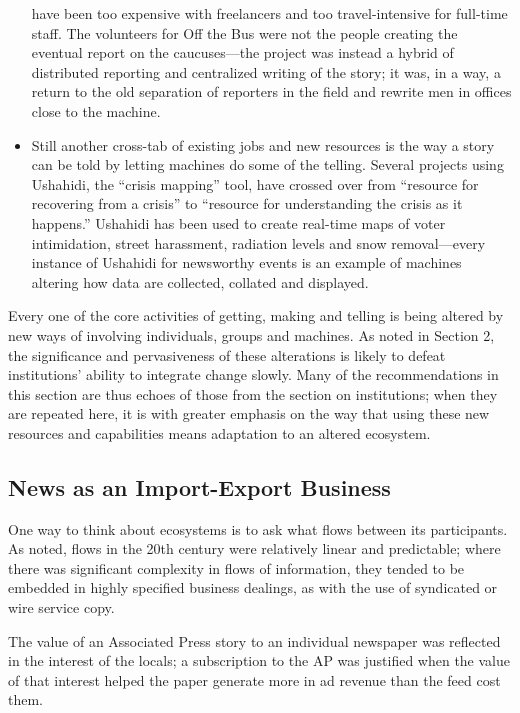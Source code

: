 \begin{itemize}
have been too expensive with freelancers and too travel-intensive for
full-time staff. The volunteers for Off the Bus were not the people
creating the eventual report on the caucuses—the project was instead
a hybrid of distributed reporting and centralized writing of the story;
it was, in a way, a return to the old separation of reporters in the field
and rewrite men in offices close to the machine.
\item Still another cross-tab of existing jobs and new resources is the way a
story can be told by letting machines do some of the telling. Several
projects using Ushahidi, the ``crisis mapping'' tool, have crossed over
from ``resource for recovering from a crisis'' to ``resource for understanding
the crisis as it happens.'' Ushahidi has been used to create real-time maps of voter intimidation, street harassment, radiation levels
and snow removal—every instance of Ushahidi for newsworthy events
is an example of machines altering how data are collected, collated
and displayed.
\end{itemize}

Every one of the core activities of getting, making and telling is being altered
by new ways of involving individuals, groups and machines. As noted in Section
2, the significance and pervasiveness of these alterations is likely to defeat
institutions’ ability to integrate change slowly. Many of the recommendations in
this section are thus echoes of those from the section on institutions; when they
are repeated here, it is with greater emphasis on the way that using these new
resources and capabilities means adaptation to an altered ecosystem.

\subsection{News as an Import-Export Business}
One way to think about ecosystems is to ask what flows between its participants.
As noted, flows in the 20th century were relatively linear and predictable;
where there was significant complexity in flows of information, they tended to
be embedded in highly specified business dealings, as with the use of syndicated
or wire service copy.

The value of an Associated Press story to an individual newspaper was reflected
in the interest of the locals; a subscription to the AP was justified when the
value of that interest helped the paper generate more in ad revenue than the
feed cost them.

